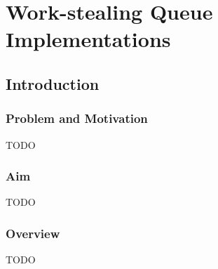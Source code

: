 
\part{Work-stealing Queue Implementations}
\label{part:queues}

\chapter{Introduction}
\label{chap:queues-introduction}

\section{Problem and Motivation}
\label{sec:queues-intro-problem-and-motivation}

TODO

\section{Aim}
\label{sec:queues-intro-aim}

TODO

\section{Overview}
\label{sec:queues-intro-overview}

TODO

